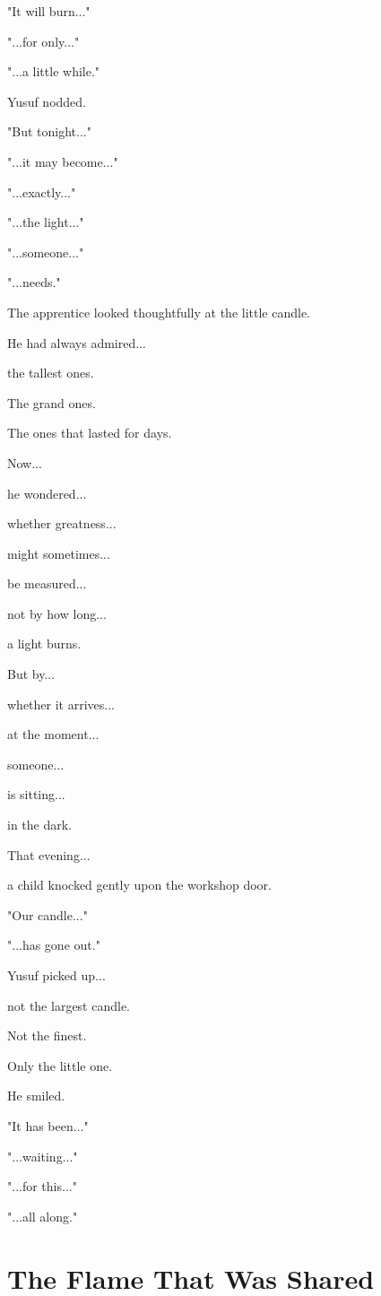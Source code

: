 \documentclass[12pt,openany]{book}
\begin{document}
"It will burn..."

"...for only..."

"...a little while."

Yusuf nodded.

"But tonight..."

"...it may become..."

"...exactly..."

"...the light..."

"...someone..."

"...needs."

The apprentice looked thoughtfully at the little candle.

He had always admired...

the tallest ones.

The grand ones.

The ones that lasted for days.

Now...

he wondered...

whether greatness...

might sometimes...

be measured...

not by how long...

a light burns.

But by...

whether it arrives...

at the moment...

someone...

is sitting...

in the dark.

That evening...

a child knocked gently upon the workshop door.

"Our candle..."

"...has gone out."

Yusuf picked up...

not the largest candle.

Not the finest.

Only the little one.

He smiled.

"It has been..."

"...waiting..."

"...for this..."

"...all along."
\section*{The Flame That Was Shared}
\end{document}

